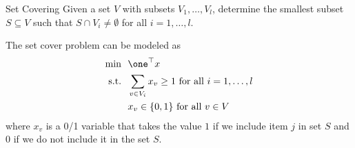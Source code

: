 \begin{general}{Set Covering}{\npcomplete}
\label{general:set-covering}
Given a set $V$ with subsets $V_1, \dots, V_l$, determine the smallest subset $S \subseteq V$ such that 
$S \cap V_i \neq \emptyset$ for all $i=1, \dots, l$.

The set cover problem can be modeled as
\begin{equation}
\begin{split}
\min \ \ & \one^\top x\\
\text{s.t.} \ \ & \sum_{v \in V_i} x_v \geq 1 \text{ for all } i =1, \dots, l \\ 
& x_v \in \{0,1\} \text{ for all } v \in V
\end{split}
\end{equation}
where $x_v$ is a 0/1 variable that takes the value $1$ if we include item $j$ in set $S$ and $0$ if we do not include it in the set $S$.  
\end{general}



%
%
%
%
%
%



